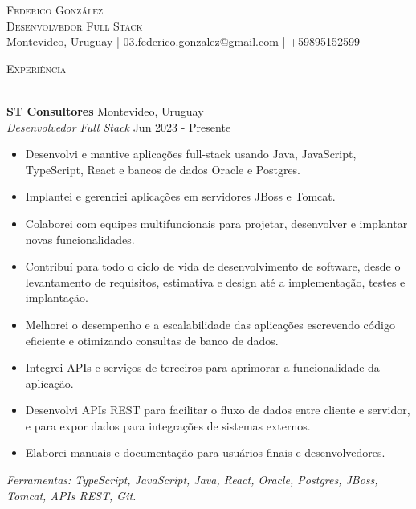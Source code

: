 \documentclass[11pt,a4paper]{article}
\newcommand{\lineunder} {
    \vspace*{-8pt} \\
    \hspace*{-18pt} \hrulefill \\
}
\newcommand{\header} [1] {
    {\hspace*{-18pt}\vspace*{6pt} \textsc{#1}}
    \vspace*{-6pt} \lineunder
}
\begin{document}
\vspace*{-34pt}

    

\vspace*{-10pt}
\begin{center}
	{\Huge \scshape {Federico González}}\\
    {\large \scshape {Desenvolvedor Full Stack}}\\
	Montevideo, Uruguay | 03.federico.gonzalez@gmail.com | +59895152599\\
\end{center}

\header{Experiência}
\vspace{0mm}

\textbf{ST Consultores} \hfill Montevideo, Uruguay\\
\textit{Desenvolvedor Full Stack} \hfill Jun 2023 - Presente\\
\vspace{-1mm}
\begin{itemize} \itemsep -1pt
	\item Desenvolvi e mantive aplicações full-stack usando Java, JavaScript, TypeScript, React e bancos de dados Oracle e Postgres.
	\item Implantei e gerenciei aplicações em servidores JBoss e Tomcat.
	\item Colaborei com equipes multifuncionais para projetar, desenvolver e implantar novas funcionalidades.
	\item Contribuí para todo o ciclo de vida de desenvolvimento de software, desde o levantamento de requisitos, estimativa e design até a implementação, testes e implantação.
	\item Melhorei o desempenho e a escalabilidade das aplicações escrevendo código eficiente e otimizando consultas de banco de dados.
	\item Integrei APIs e serviços de terceiros para aprimorar a funcionalidade da aplicação.
	\item Desenvolvi APIs REST para facilitar o fluxo de dados entre cliente e servidor, e para expor dados para integrações de sistemas externos.
	\item Elaborei manuais e documentação para usuários finais e desenvolvedores.
\end{itemize}
\vspace{-1mm}
\textit{Ferramentas: TypeScript, JavaScript, Java, React, Oracle, Postgres, JBoss, Tomcat, APIs REST, Git.}
\end{document}
